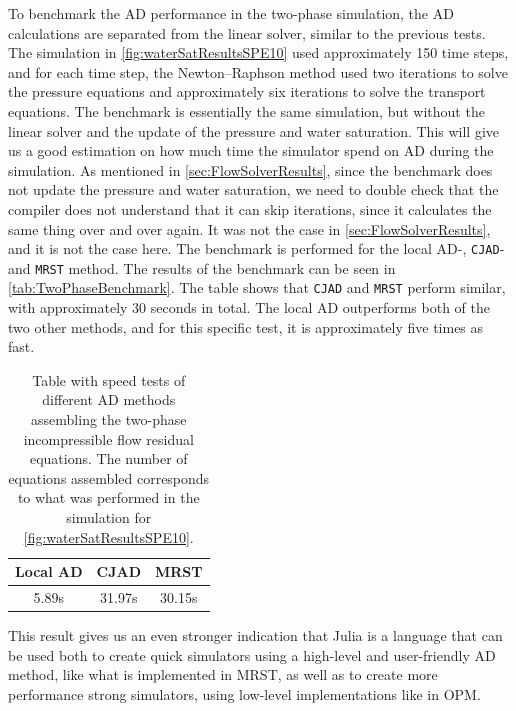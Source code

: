To benchmark the AD performance in the two-phase simulation, the AD calculations are separated from the linear solver, similar to the previous tests. The simulation in \autoref{fig:waterSatResultsSPE10} used approximately 150 time steps, and for each time step, the Newton--Raphson method used two iterations to solve the pressure equations and approximately six iterations to solve the transport equations. The benchmark is essentially the same simulation, but without the linear solver and the update of the pressure and water saturation. This will give us a good estimation on how much time the simulator spend on AD during the simulation. As mentioned in \autoref{sec:FlowSolverResults}, since the benchmark does not update the pressure and water saturation, we need to double check that the compiler does not understand that it can skip iterations, since it calculates the same thing over and over again. It was not the case in \autoref{sec:FlowSolverResults}, and it is not the case here. The benchmark is performed for the local AD-, \texttt{CJAD}- and \texttt{MRST} method. The results of the benchmark can be seen in \autoref{tab:TwoPhaseBenchmark}. The table shows that \texttt{CJAD} and \texttt{MRST} perform similar, with approximately 30 seconds in total. The local AD outperforms both of the two other methods, and for this specific test, it is approximately five times as fast.
\begin{table}[b]
    \centering
    \caption{Table with speed tests of different AD methods assembling the two-phase incompressible flow residual     equations. The number of equations assembled corresponds to what was performed in the simulation for \autoref{fig:waterSatResultsSPE10}.}
    \label{tab:TwoPhaseBenchmark}
    \def\arraystretch{1.5}
    \begin{tabular}{ccc}
    \textbf{Local AD} & \textbf{CJAD} & \textbf{MRST}\\
        \hline
        5.89s & 31.97s & 30.15s \\  
        \hline
    \end{tabular}
\end{table}
This result gives us an even stronger indication that Julia is a language that can be used both to create quick simulators using a high-level and user-friendly AD method, like what is implemented in MRST, as well as to create more performance strong simulators, using low-level implementations like in OPM.